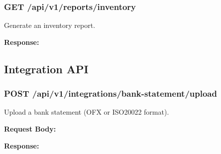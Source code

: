 \subsubsection{GET
/api/v1/reports/inventory}\label{get-apiv1reportsinventory}

Generate an inventory report.

\textbf{Response:}

\begin{Shaded}
\begin{Highlighting}[]
\FunctionTok{\{}
  \FunctionTok{:} \FunctionTok{,}
  \FunctionTok{:} 
\FunctionTok{\}}
\end{Highlighting}
\end{Shaded}

\subsection{Integration API}\label{integration-api}

\subsubsection{POST
/api/v1/integrations/bank-statement/upload}\label{post-apiv1integrationsbank-statementupload}

Upload a bank statement (OFX or ISO20022 format).

\textbf{Request Body:}

\begin{Shaded}
\begin{Highlighting}[]
\FunctionTok{\{}
  \FunctionTok{:} \FunctionTok{,}
  \FunctionTok{:} 
\FunctionTok{\}}
\end{Highlighting}
\end{Shaded}

\textbf{Response:}

\begin{Shaded}
\begin{Highlighting}[]
\FunctionTok{\{}
  \FunctionTok{:} \FunctionTok{,}
  \FunctionTok{:} \FunctionTok{,}
  \FunctionTok{:} \FunctionTok{,}
  \FunctionTok{:} \OtherTok{[]}
\FunctionTok{\}}
\end{Highlighting}
\end{Shaded}

